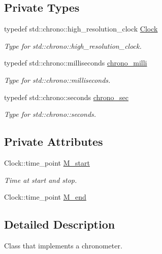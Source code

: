 \subsection*{Private Types}
\begin{DoxyCompactItemize}
\item 
typedef std\+::chrono\+::high\+\_\+resolution\+\_\+clock \hyperlink{classFVCode3D_1_1Chrono_a28b4a3f6072e73d2a4bc6308ba88a6bb}{Clock}
\begin{DoxyCompactList}\small\item\em Type for std\+::chrono\+::high\+\_\+resolution\+\_\+clock. \end{DoxyCompactList}\item 
typedef std\+::chrono\+::milliseconds \hyperlink{classFVCode3D_1_1Chrono_abb09cf94de0298f1e42b9b93d9134bee}{chrono\+\_\+milli}
\begin{DoxyCompactList}\small\item\em Type for std\+::chrono\+::milliseconds. \end{DoxyCompactList}\item 
typedef std\+::chrono\+::seconds \hyperlink{classFVCode3D_1_1Chrono_a282eb6bb9bc31cca9094ecd4c7c1939f}{chrono\+\_\+sec}
\begin{DoxyCompactList}\small\item\em Type for std\+::chrono\+::seconds. \end{DoxyCompactList}\end{DoxyCompactItemize}
\subsection*{Private Attributes}
\begin{DoxyCompactItemize}
\item 
Clock\+::time\+\_\+point \hyperlink{classFVCode3D_1_1Chrono_aed2f31857e3d6f7ef71e2e36832f3286}{M\+\_\+start}
\begin{DoxyCompactList}\small\item\em Time at start and stop. \end{DoxyCompactList}\item 
Clock\+::time\+\_\+point \hyperlink{classFVCode3D_1_1Chrono_a4ba4c5c8b4393d2484a169c631977e40}{M\+\_\+end}
\end{DoxyCompactItemize}


\subsection{Detailed Description}
Class that implements a chronometer. 


